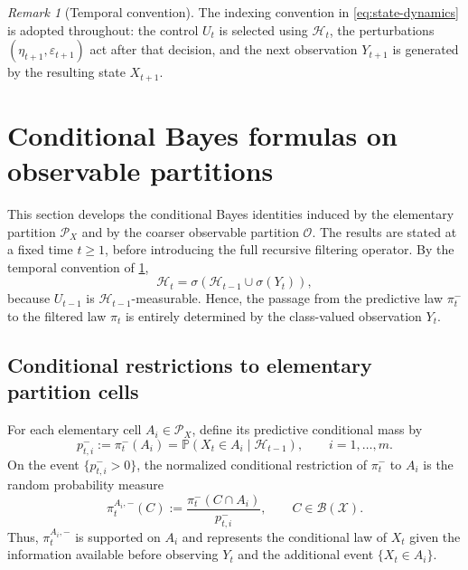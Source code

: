 \documentclass[10pt,twocolumn]{article}
\theoremstyle{remark}
\newtheorem{remark}{Remark}
\newcommand{\Pp}{\mathbb{P}}
\newcommand{\B}{\mathcal{B}}
\newcommand{\Hh}{\mathcal{H}}
\newcommand{\Oo}{\mathcal{O}}
\newcommand{\Pcal}{\mathcal{P}}
\newcommand{\Xcal}{\mathcal{X}}
\begin{document}
\begin{remark}[Temporal convention]
\label{rem:temporal-convention}
The indexing convention in \cref{eq:state-dynamics} is adopted throughout: the control $U_t$ is selected using $\Hh_t$, the perturbations $(\eta_{t+1},\varepsilon_{t+1})$ act after that decision, and the next observation $Y_{t+1}$ is generated by the resulting state $X_{t+1}$.
\end{remark}

%
%

\section{Conditional Bayes formulas on observable partitions}
\label{sec:conditional-bayes}

This section develops the conditional Bayes identities induced by the elementary partition $\Pcal_X$ and by the coarser observable partition $\Oo$. The results are stated at a fixed time $t\geq 1$, before introducing the full recursive filtering operator. By the temporal convention of \cref{rem:temporal-convention},
\[
\Hh_t=\sigma(\Hh_{t-1} \cup \sigma(Y_t)),
\]
because $U_{t-1}$ is $\Hh_{t-1}$-measurable. Hence, the passage from the predictive law $\pi_t^{-}$ to the filtered law $\pi_t$ is entirely determined by the class-valued observation $Y_t$.

\subsection{Conditional restrictions to elementary partition cells}
\label{subsec:conditional-restrictions}

For each elementary cell $A_i\in\Pcal_X$, define its predictive conditional mass by
\begin{equation}
	p_{t,i}^{-}:=\pi_t^{-}(A_i)
	=\Pp(X_t\in A_i\mid\Hh_{t-1}),
	\qquad i=1,\ldots,m.
	\label{eq:cell-predictive-mass}
\end{equation}
On the event $\{p_{t,i}^{-}>0\}$, the normalized conditional restriction of $\pi_t^{-}$ to $A_i$ is the random probability measure
\begin{equation}
	\pi_t^{A_i,-}(C)
	:=\frac{\pi_t^{-}(C\cap A_i)}{p_{t,i}^{-}},
	\qquad C\in\B(\Xcal).
	\label{eq:cell-conditional-measure}
\end{equation}
Thus, $\pi_t^{A_i,-}$ is supported on $A_i$ and represents the conditional law of $X_t$ given the information available before observing $Y_t$ and the additional event $\{X_t\in A_i\}$.
\end{document}
